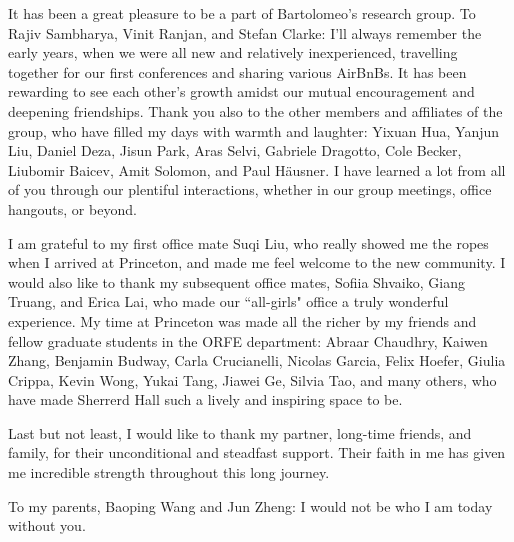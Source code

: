 \documentclass[12pt]{report}
\begin{document}
It has been a great pleasure to be a part of Bartolomeo's research group. To Rajiv Sambharya, Vinit Ranjan, and Stefan Clarke: I'll always remember the early years, when we were all new and relatively inexperienced, travelling together for our first conferences and sharing various AirBnBs. It has been rewarding to see each other's growth amidst our mutual encouragement and deepening friendships. Thank you also to the other members and affiliates of the group, who have filled my days with warmth and laughter: Yixuan Hua, Yanjun Liu, Daniel Deza, Jisun Park, Aras Selvi, Gabriele Dragotto, Cole Becker, Liubomir Baicev, Amit Solomon, and Paul Häusner. I have learned a lot from all of you through our plentiful interactions, whether in our group meetings, office hangouts, or beyond. 


I am grateful to my first office mate Suqi Liu, who really showed me the ropes when I arrived at Princeton, and made me feel welcome to the new community. I would also like to thank my subsequent office mates, Sofiia Shvaiko, Giang Truang, and Erica Lai, who made our ``all-girls" office a truly wonderful experience. 
My time at Princeton was made all the richer by my friends and fellow graduate students in the ORFE department: Abraar Chaudhry, Kaiwen Zhang, Benjamin Budway, Carla Crucianelli,  Nicolas Garcia, Felix Hoefer, Giulia Crippa, Kevin Wong, Yukai Tang, Jiawei Ge, Silvia Tao, and many others, who have made Sherrerd Hall such a lively and inspiring space to be.


Last but not least, I would like to thank my partner, long-time friends, and family, for their unconditional and steadfast support. Their faith in me has given me incredible strength throughout this long journey. 

To my parents, Baoping Wang and Jun Zheng: I would not be who I am today without you.



\endgroup

\newpage

\tableofcontents

\listoffigures
{}

\listoftables
{}

\renewcommand\arraystretch{1.2}










% 


\appendix

\end{document}
